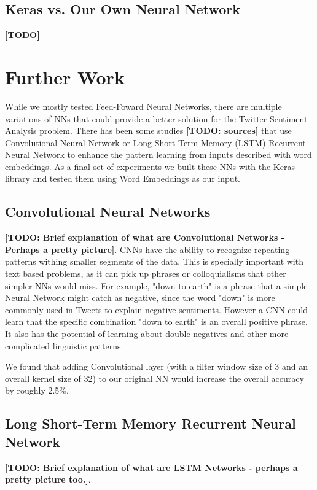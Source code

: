\documentclass[11pt,onecolumn]{article} %
\begin{document}
\subsection{Keras vs. Our Own Neural Network}
\textbf{[TODO]}

\section{Further Work}
While we mostly tested Feed-Foward Neural Networks, there are multiple variations of NNs that could provide a better solution for the Twitter Sentiment Analysis problem. There has been some studies \textbf{[TODO: sources]} that use Convolutional Neural Network or Long Short-Term Memory (LSTM) Recurrent Neural Network to enhance the pattern learning from inputs described with word embeddings. As a final set of experiments we built these NNs with the Keras library and tested them using Word Embeddings as our input.

\subsection{Convolutional Neural Networks}
\textbf{[TODO: Brief explanation of what are Convolutional Networks - Perhaps a pretty picture]}. CNNs have the ability to recognize repeating patterns withing smaller segments of the data. This is specially important with text based problems, as it can pick up phrases or colloquialisms that other simpler NNs would miss. For example, "down to earth" is a phrase that a simple Neural Network might catch as negative, since the word "down" is more commonly used in Tweets to explain negative sentiments. However a CNN could learn that the specific combination "down to earth" is an overall positive phrase. It also has the potential of learning about double negatives and other more complicated linguistic patterns.
\par We found that adding Convolutional layer (with a filter window size of 3 and an overall kernel size of 32) to our original NN would increase the overall accuracy by roughly 2.5\%.

\subsection{Long Short-Term Memory Recurrent Neural Network}
\textbf{[TODO: Brief explanation of what are LSTM Networks - perhaps a pretty picture too.]}.
\end{document}
